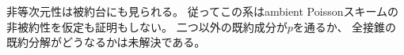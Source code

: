 \begin{remark}
非等次元性は被約台にも見られる。
従ってこの系はambient Poissonスキームの
非被約性を仮定も証明もしない。
二つ以外の既約成分が\(p\)を通るか、
全接錐の既約分解がどうなるかは未解決である。
\end{remark}
